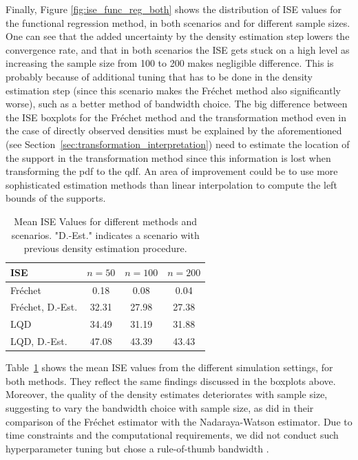 Finally, Figure \ref{fig:ise_func_reg_both} shows the distribution of ISE values for
the functional regression method, in both scenarios and for different sample sizes. One
can see that the added uncertainty by the density estimation step lowers the convergence
rate, and that in both scenarios the ISE gets stuck on a high level as increasing the
sample size from 100 to 200 makes negligible difference. This is probably
because of additional tuning that has to be done in the density estimation step (since
this scenario makes the Fréchet method also significantly worse), such as a better method
of bandwidth choice. The big difference between the ISE boxplots for the Fréchet method and
the transformation method even in the case of directly observed densities must be explained
by the aforementioned (see Section~\ref{sec:transformation_interpretation}) need to
estimate the location of the support in the transformation method since this information
is lost when transforming the pdf to the qdf. An area of improvement could be to use
more sophisticated estimation methods than linear interpolation to compute the left bounds
of the supports.

\begin{table}[h!]
    \centering
    \begin{tabular}{lccc}
        \hline
        ISE & $n = 50$ & $n = 100$ & $n = 200$ \\
        \hline
        Fréchet             & 0.18 & 0.08 & 0.04 \\
        Fréchet, D.-Est.    & 32.31 & 27.98 & 27.38 \\
        LQD                 & 34.49 & 31.19 & 31.88 \\
        LQD, D.-Est.        & 47.08 & 43.39 & 43.43 \\
        \hline
    \end{tabular}
    \caption{Mean ISE Values for different methods and scenarios. "D.-Est." indicates
    a scenario with previous density estimation procedure.}
    \label{tab:mean_ise_values}
\end{table}
Table~\ref{tab:mean_ise_values} shows the mean ISE values from the different simulation
settings, for both methods. They reflect the same findings discussed in the boxplots
above.
Moreover, the quality of the density estimates deteriorates with sample size, suggesting
to vary the bandwidth choice with sample size, as \textcite{PetersenMüller2019} did in
their comparison of the Fréchet estimator with the Nadaraya-Watson estimator. Due to
time constraints and the computational requirements, we did not conduct such
hyperparameter tuning but chose a rule-of-thumb bandwidth
\parencites[Chapter~3.4.1]{Silverman1986}[Chapter~2.2.1]{LiRacine2007}.

